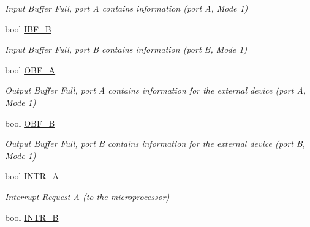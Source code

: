 \begin{DoxyCompactItemize}
\begin{DoxyCompactList}\small\item\em Input Buffer Full, port A contains information (port A, Mode 1) \end{DoxyCompactList}\item 
\hypertarget{classIntel8255_a5576bb32d1d14c809954c95b1e140b00}{bool \hyperlink{classIntel8255_a5576bb32d1d14c809954c95b1e140b00}{I\-B\-F\-\_\-\-B}}\label{classIntel8255_a5576bb32d1d14c809954c95b1e140b00}

\begin{DoxyCompactList}\small\item\em Input Buffer Full, port B contains information (port B, Mode 1) \end{DoxyCompactList}\item 
\hypertarget{classIntel8255_ad6207273407dcfb3ed9785613838baf7}{bool \hyperlink{classIntel8255_ad6207273407dcfb3ed9785613838baf7}{O\-B\-F\-\_\-\-A}}\label{classIntel8255_ad6207273407dcfb3ed9785613838baf7}

\begin{DoxyCompactList}\small\item\em Output Buffer Full, port A contains information for the external device (port A, Mode 1) \end{DoxyCompactList}\item 
\hypertarget{classIntel8255_a5d84e8f433d4aeaf15d5f79cbadd878e}{bool \hyperlink{classIntel8255_a5d84e8f433d4aeaf15d5f79cbadd878e}{O\-B\-F\-\_\-\-B}}\label{classIntel8255_a5d84e8f433d4aeaf15d5f79cbadd878e}

\begin{DoxyCompactList}\small\item\em Output Buffer Full, port B contains information for the external device (port B, Mode 1) \end{DoxyCompactList}\item 
\hypertarget{classIntel8255_a1b037b991428a40a2c4437723fc26b63}{bool \hyperlink{classIntel8255_a1b037b991428a40a2c4437723fc26b63}{I\-N\-T\-R\-\_\-\-A}}\label{classIntel8255_a1b037b991428a40a2c4437723fc26b63}

\begin{DoxyCompactList}\small\item\em Interrupt Request A (to the microprocessor) \end{DoxyCompactList}\item 
\hypertarget{classIntel8255_af60b776612a4b393fb3ceb0fcb273750}{bool \hyperlink{classIntel8255_af60b776612a4b393fb3ceb0fcb273750}{I\-N\-T\-R\-\_\-\-B}}\label{classIntel8255_af60b776612a4b393fb3ceb0fcb273750}


\end{DoxyCompactItemize}
